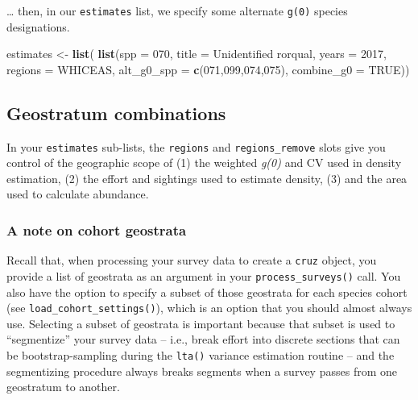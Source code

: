 \documentclass[
]{book}
\newenvironment{Shaded}{\begin{snugshade}}{\end{snugshade}}
\newcommand{\AttributeTok}[1]{\textcolor[rgb]{0.13,0.29,0.53}{#1}}
\newcommand{\ConstantTok}[1]{\textcolor[rgb]{0.56,0.35,0.01}{#1}}
\newcommand{\DecValTok}[1]{\textcolor[rgb]{0.00,0.00,0.81}{#1}}
\newcommand{\FunctionTok}[1]{\textcolor[rgb]{0.13,0.29,0.53}{\textbf{#1}}}
\newcommand{\NormalTok}[1]{#1}
\newcommand{\OtherTok}[1]{\textcolor[rgb]{0.56,0.35,0.01}{#1}}
\newcommand{\StringTok}[1]{\textcolor[rgb]{0.31,0.60,0.02}{#1}}
\begin{document}
\ldots{} then, in our \texttt{estimates} list, we specify some alternate \texttt{g(0)} species designations.

\begin{Shaded}
\begin{Highlighting}[]
\NormalTok{estimates }\OtherTok{\textless{}{-}} \FunctionTok{list}\NormalTok{(}
    \FunctionTok{list}\NormalTok{(}\AttributeTok{spp =} \StringTok{\textquotesingle{}070\textquotesingle{}}\NormalTok{,}
         \AttributeTok{title =} \StringTok{\textquotesingle{}Unidentified rorqual\textquotesingle{}}\NormalTok{,}
         \AttributeTok{years =} \DecValTok{2017}\NormalTok{,}
         \AttributeTok{regions =} \StringTok{\textquotesingle{}WHICEAS\textquotesingle{}}\NormalTok{,}
         \AttributeTok{alt\_g0\_spp =} \FunctionTok{c}\NormalTok{(}\StringTok{\textquotesingle{}071\textquotesingle{}}\NormalTok{,}\StringTok{\textquotesingle{}099\textquotesingle{}}\NormalTok{,}\StringTok{\textquotesingle{}074\textquotesingle{}}\NormalTok{,}\StringTok{\textquotesingle{}075\textquotesingle{}}\NormalTok{),}
         \AttributeTok{combine\_g0 =} \ConstantTok{TRUE}\NormalTok{))}
\end{Highlighting}
\end{Shaded}

\hypertarget{geostratum-combinations}{%
\subsection*{Geostratum combinations}\label{geostratum-combinations}}

In your \texttt{estimates} sub-lists, the \texttt{regions} and \texttt{regions\_remove} slots give you control of the geographic scope of (1) the weighted \emph{g(0)} and CV used in density estimation, (2) the effort and sightings used to estimate density, (3) and the area used to calculate abundance.

\hypertarget{a-note-on-cohort-geostrata}{%
\subsubsection*{A note on cohort geostrata}\label{a-note-on-cohort-geostrata}}

Recall that, when processing your survey data to create a \texttt{cruz} object, you provide a list of geostrata as an argument in your \texttt{process\_surveys()} call. You also have the option to specify a subset of those geostrata for each species cohort (see \texttt{load\_cohort\_settings()}), which is an option that you should almost always use. Selecting a subset of geostrata is important because that subset is used to ``segmentize'' your survey data -- i.e., break effort into discrete sections that can be bootstrap-sampling during the \texttt{lta()} variance estimation routine -- and the segmentizing procedure always breaks segments when a survey passes from one geostratum to another.
\end{document}

